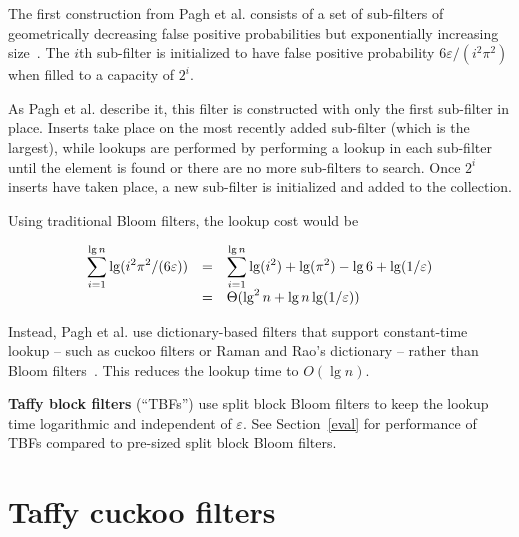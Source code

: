 \documentclass[letterpaper,twocolumn,10pt]{article}
\newcommand{\etal}{et al.}
\begin{document}
The first construction from Pagh \etal{} consists of a set of sub-filters of geometrically decreasing false positive probabilities but exponentially increasing size~\cite{psw}.
The $i$th sub-filter is initialized to have false positive probability $6 \varepsilon/(i^2 \pi^2)$ when filled to a capacity of $2^i$.

As Pagh \etal{} describe it, this filter is constructed with only the first sub-filter in place.
Inserts take place on the most recently added sub-filter (which is the largest), while lookups are performed by performing a lookup in each sub-filter until the element is found or there are no more sub-filters to search.
Once $2^i$ inserts have taken place, a new sub-filter is initialized and added to the collection.

Using traditional Bloom filters, the lookup cost would be

\[
\begin{array}{r c l}
\displaystyle\sum_{i=1}^{\lg n} \lg (i^2 \pi^2 /(6 \varepsilon)) & = &
 \displaystyle\sum_{i=1}^{\lg n} \lg (i^2) + \lg( \pi^2) - \lg 6 + \lg (1/\varepsilon) \\
& = & \Theta(\lg^2 n + \lg n \lg (1/\varepsilon))
\end{array}
\]

Instead, Pagh \etal{} use dictionary-based filters that support constant-time lookup -- such as cuckoo filters or Raman and Rao's dictionary -- rather than Bloom filters~\cite{succinct,psw}.
This reduces the lookup time to $O(\lg n)$.

{\bf Taffy block filters} (``TBFs'') use split block Bloom filters to keep the lookup time logarithmic and independent of $\varepsilon$.
See Section~\ref{eval} for performance of TBFs compared to pre-sized split block Bloom filters.


\section{Taffy cuckoo filters}
\label{tcf}
\end{document}
